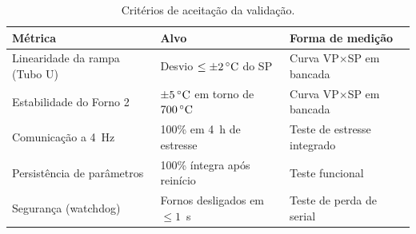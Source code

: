 \begin{table}[htbp]
\centering
\caption{Crit\'erios de aceita\c{c}\~ao da valida\c{c}\~ao.}
\label{tab:criterios}
\begin{tabular}{p{4.6cm}p{4.6cm}p{5.6cm}}
\toprule
\textbf{M\'etrica} & \textbf{Alvo} & \textbf{Forma de medi\c{c}\~ao} \\
\midrule
Linearidade da rampa (Tubo U) & Desvio $\le \pm 2\,\celsius$ do SP & Curva VP$\times$SP em bancada \\
Estabilidade do Forno 2 & $\pm 5\,\celsius$ em torno de $700\,\celsius$ & Curva VP$\times$SP em bancada \\
Comunica\c{c}\~ao a 4~Hz & 100\% em 4~h de estresse & Teste de estresse integrado \\
Persist\^encia de par\^ametros & 100\% \'integra ap\'os rein\'icio & Teste funcional \\
Seguran\c{c}a (watchdog) & Fornos desligados em $\le 1$~s & Teste de perda de serial \\
\bottomrule
\end{tabular}
\end{table}
